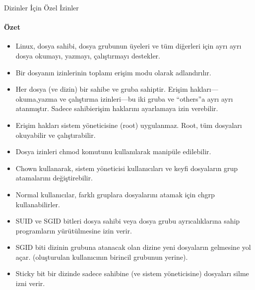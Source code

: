 \begin{section}{Dizinler İçin Özel İzinler}
\paragraph{Özet}{
\begin{itemize}
\item Linux, dosya sahibi, dosya grubunun üyeleri ve tüm diğerleri için ayrı ayrı dosya okumayı, yazmayı, çalıştırmayı destekler.
\item Bir dosyanın izinlerinin toplamı erişim modu olarak adlandırılır.
\item Her dosya (ve dizin) bir sahibe ve gruba sahiptir. Erişim hakları—okuma,yazma ve çalıştırma izinleri—bu iki gruba ve “others”a ayrı ayrı atanmıştır. Sadece sahibierişim haklarını ayarlamaya izin verebilir.
\item Erişim hakları sistem yöneticisine (root) uygulanmaz. Root, tüm dosyaları okuyabilir ve çalıştırabilir.
\item Dosya izinleri chmod komutunu kullanılarak manipüle edilebilir.
\item Chown kullanarak, sistem yöneticisi kullanıcıları ve keyfi dosyaların grup atamalarını değiştirebilir.
\item Normal kullanıcılar, farklı gruplara dosyalarını atamak için chgrp kullanabilirler.
\item SUID ve SGID bitleri dosya sahibi veya dosya grubu ayrıcalıklarına sahip programların yürütülmesine izin verir.
\item SGID biti dizinin grubuna atanacak olan dizine yeni dosyaların gelmesine yol açar. (oluşturulan kullanıcının birincil grubunun yerine).
\item Sticky bit bir dizinde sadece sahibine (ve sistem yöneticisine) dosyaları silme izni verir. 
\end{itemize}
}
\end{section}